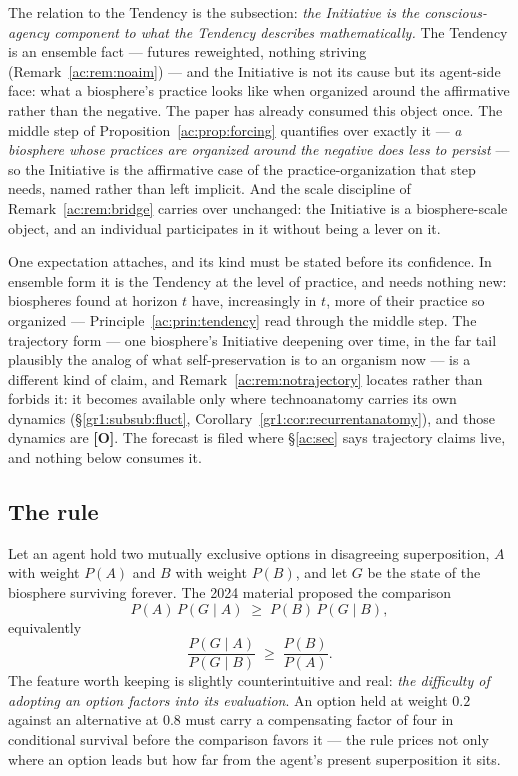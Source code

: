 \documentclass[11pt]{article}
\numberwithin{equation}{section}
\theoremstyle{plain}
\theoremstyle{definition}
\theoremstyle{remark}
\begin{document}
The relation to the Tendency is the subsection: \emph{the Initiative is the conscious-agency component to what the Tendency describes mathematically.} The Tendency is an ensemble fact --- futures reweighted, nothing striving (Remark~\ref{ac:rem:noaim}) --- and the Initiative is not its cause but its agent-side face: what a biosphere's practice looks like when organized around the affirmative rather than the negative. The paper has already consumed this object once. The middle step of Proposition~\ref{ac:prop:forcing} quantifies over exactly it --- \emph{a biosphere whose practices are organized around the negative does less to persist} --- so the Initiative is the affirmative case of the practice-organization that step needs, named rather than left implicit. And the scale discipline of Remark~\ref{ac:rem:bridge} carries over unchanged: the Initiative is a biosphere-scale object, and an individual participates in it without being a lever on it.

One expectation attaches, and its kind must be stated before its confidence. In ensemble form it is the Tendency at the level of practice, and needs nothing new: biospheres found at horizon $t$ have, increasingly in $t$, more of their practice so organized --- Principle~\ref{ac:prin:tendency} read through the middle step. The trajectory form --- one biosphere's Initiative deepening over time, in the far tail plausibly the analog of what self-preservation is to an organism now --- is a different kind of claim, and Remark~\ref{ac:rem:notrajectory} locates rather than forbids it: it becomes available only where technoanatomy carries its own dynamics (\S\ref{gr1:subsub:fluct}, Corollary~\ref{gr1:cor:recurrentanatomy}), and those dynamics are \textbf{[O]}. The forecast is filed where \S\ref{ac:sec} says trajectory claims live, and nothing below consumes it.

\subsection{The rule}\label{gs:sub:rule}

Let an agent hold two mutually exclusive options in disagreeing superposition, $A$ with weight $P(A)$ and $B$ with weight $P(B)$, and let $G$ be the state of the biosphere surviving forever. The 2024 material proposed the comparison
\begin{equation}\label{gs:eq:rule}
    P(A)\,P(G \mid A) \;\ge\; P(B)\,P(G \mid B),
\end{equation}
equivalently
\begin{equation}\label{gs:eq:ratio}
    \frac{P(G \mid A)}{P(G \mid B)} \;\ge\; \frac{P(B)}{P(A)}.
\end{equation}
The feature worth keeping is slightly counterintuitive and real: \emph{the difficulty of adopting an option factors into its evaluation}. An option held at weight $0.2$ against an alternative at $0.8$ must carry a compensating factor of four in conditional survival before the comparison favors it --- the rule prices not only where an option leads but how far from the agent's present superposition it sits.
\end{document}
